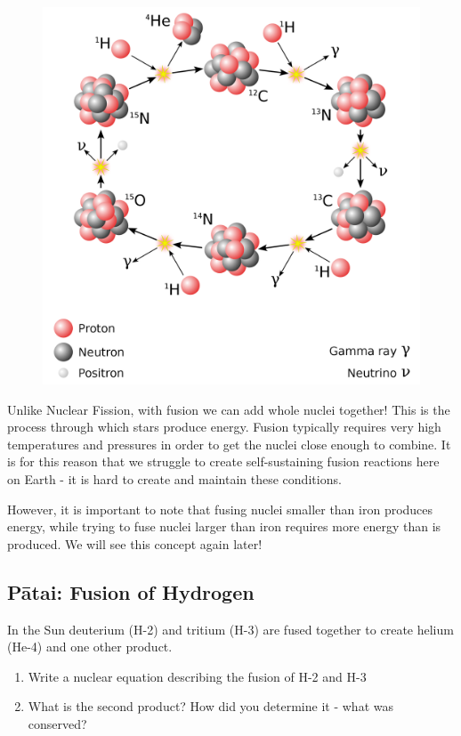 \documentclass[12pt]{report}
\begin{document}
{\begin{figure}
	\centering
	\includegraphics[width=0.9\linewidth]{CNO-cycle.png}
\end{figure}

Unlike Nuclear Fission, with fusion we can add whole nuclei together! This is the process through which stars produce energy. Fusion typically requires very high temperatures and pressures in order to get the nuclei close enough to combine. It is for this reason that we struggle to create self-sustaining fusion reactions here on Earth - it is hard to create and maintain these conditions.

However, it is important to note that fusing nuclei smaller than iron produces energy, while trying to fuse nuclei larger than iron requires more energy than is produced. We will see this concept again later!

\subsection{Pātai: Fusion of Hydrogen}
In the Sun deuterium (H-2) and tritium (H-3) are fused together to create helium (He-4) and one other product.

\begin{enumerate}[itemsep=1.5cm]
	\item Write a nuclear equation describing the fusion of H-2 and H-3
	\item What is the second product? How did you determine it - what was conserved?\vspace{2cm}
\end{enumerate}

}
\end{document}
